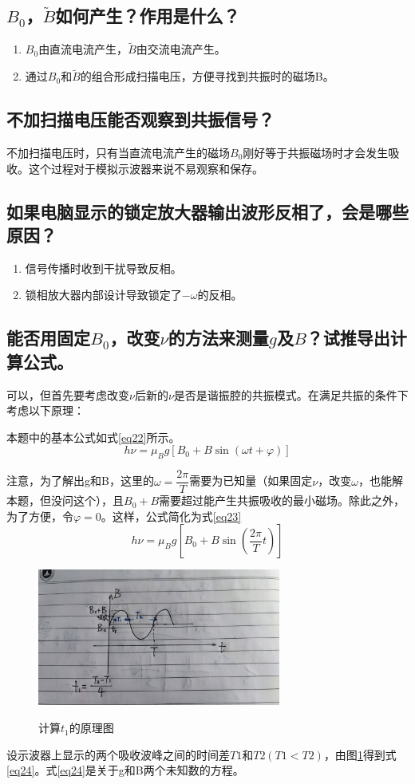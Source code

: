 \documentclass[a4paper]{article}
\begin{document}
\subsection{$B_0$，$\tilde{B}$如何产生？作用是什么？}
\begin{enumerate}
\item $B_0$由直流电流产生，$\tilde{B}$由交流电流产生。
\item 通过$B_0$和$\tilde{B}$的组合形成扫描电压，方便寻找到共振时的磁场B。
\end{enumerate}
\subsection{不加扫描电压能否观察到共振信号？}
不加扫描电压时，只有当直流电流产生的磁场$B_0$刚好等于共振磁场时才会发生吸收。这个过程对于模拟示波器来说不易观察和保存。
\subsection{如果电脑显示的锁定放大器输出波形反相了，会是哪些原因？}
\begin{enumerate}
\item 信号传播时收到干扰导致反相。
\item 锁相放大器内部设计导致锁定了$-\omega$的反相。
\end{enumerate}
\subsection{能否用固定$B_0$，改变$\nu$的方法来测量$ g $及$ B $？试推导出计算公式。}
可以，但首先要考虑改变$\nu$后新的$\nu$是否是谐振腔的共振模式。在满足共振的条件下考虑以下原理：

本题中的基本公式如式{\ref{eq22}}所示。
\begin{equation}
h\nu = \mu_B g [B_0 + B\sin(\omega t + \varphi)]
\label{eq22}
\end{equation}

注意，为了解出g和B，这里的$\omega = \dfrac{2\pi}{T}$需要为已知量（如果固定$\nu$，改变$\omega$，也能解本题，但没问这个），且$B_0+B$需要超过能产生共振吸收的最小磁场。除此之外，为了方便，令$\varphi = 0$。这样，公式简化为式{\ref{eq23}}
\begin{equation}
    h\nu = \mu_B g [B_0 + B\sin(\dfrac{2\pi}{T} t)]
    \label{eq23}
    \end{equation}

\begin{figure}[!h]
\centering
\includegraphics[width=8cm]{img/3.jpg}\\
\caption{计算$t_1$的原理图}\label{sikaofig2}
\end{figure}
设示波器上显示的两个吸收波峰之间的时间差$T1$和$T2(T1<T2)$，由图{\ref{sikaofig2}}得到式{\ref{eq24}}。式{\ref{eq24}}是关于g和B两个未知数的方程。
\end{document}

